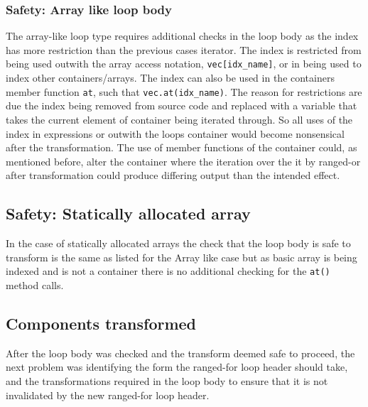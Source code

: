 \documentclass[bsc,frontabs,singlespacing,parskip,deptreport]{infthesis}
\begin{document}
\subsubsection{Safety: Array like loop body}
The array-like loop type requires additional checks in the loop body as the index has more restriction than the previous cases iterator. The index is restricted from being used outwith the array access notation, \texttt{vec[idx\_name]}, or in being used to index other containers/arrays. The index can also  be used in the containers member function \texttt{at}, such that \texttt{vec.at(idx\_name)}. The reason for restrictions are due the index being removed from source code and replaced with a variable that takes the current element of container being iterated through. So all uses of the index in expressions or outwith the loops container would become nonsensical after the transformation. The use of member functions of the container could, as mentioned before, alter the container where the iteration over the it by ranged-or after transformation could produce differing output than the intended effect. 

\subsection{Safety: Statically allocated array }
In the case of statically allocated arrays the check that the loop body is safe to transform is the same as listed for the Array like case but as basic array is being indexed and is not a container there is no additional checking for the \texttt{at()} method calls.  



\subsection{Components transformed}
After the loop body was checked and the transform deemed safe to proceed, the next problem was identifying the form the ranged-for loop header should take, and the transformations required in the loop body to ensure that it is not invalidated by the new ranged-for loop header.
\end{document}
